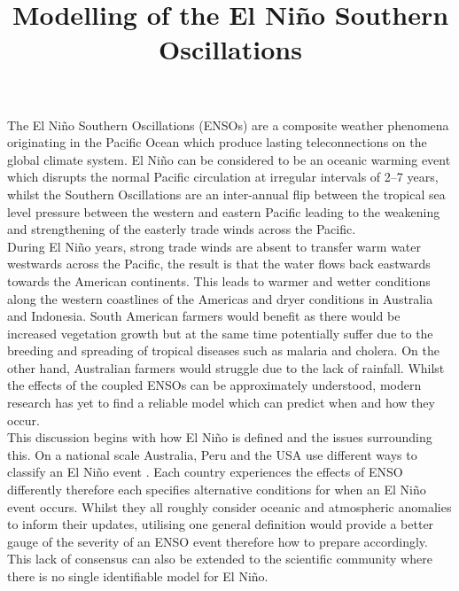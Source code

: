 \documentclass[12pt, onecolumn]{revtex4}    %
\begin{document}
                     

\title{Modelling of the El Ni\~{n}o Southern Oscillations} 

\maketitle
\thispagestyle{plain} %

The El Ni\~{n}o Southern Oscillations (ENSOs) are a composite weather phenomena originating in the Pacific Ocean which produce lasting teleconnections on the global climate system. El Ni\~{n}o can be considered to be an oceanic warming event which disrupts the normal Pacific circulation at irregular intervals of 2--7 years, whilst the Southern Oscillations are an inter-annual flip between the tropical sea level pressure between the western and eastern Pacific leading to the weakening and strengthening of the easterly trade winds across the Pacific. \\

During El Ni\~{n}o years, strong trade winds are absent to transfer warm water westwards across the Pacific, the result is that the water flows back eastwards towards the American continents. This leads to warmer and wetter conditions along the western coastlines of the Americas and dryer conditions in Australia and Indonesia. South American farmers would benefit as there would be increased vegetation growth but at the same time potentially suffer due to the breeding and spreading of tropical diseases such as malaria and cholera. On the other hand, Australian farmers would struggle due to the lack of rainfall. Whilst the effects of the coupled ENSOs can be approximately understood, modern research has yet to find a reliable model which can predict when and how they occur. \\

This discussion begins with how El Ni\~{n}o is defined and the issues surrounding this. On a national scale Australia, Peru and the USA use different ways to classify an El Ni\~{n}o event \citep{doi:10.1175/BAMS-D-16-0009.1}. Each country experiences the effects of ENSO differently therefore each specifies alternative conditions for when an El Ni\~{n}o event occurs. Whilst they all roughly consider oceanic and atmospheric anomalies to inform their updates, utilising one general definition would provide a better gauge of the severity of an ENSO event therefore how to prepare accordingly. This lack of consensus can also be extended to the scientific community where there is no single identifiable model for El Ni\~{n}o. \\
\end{document}

